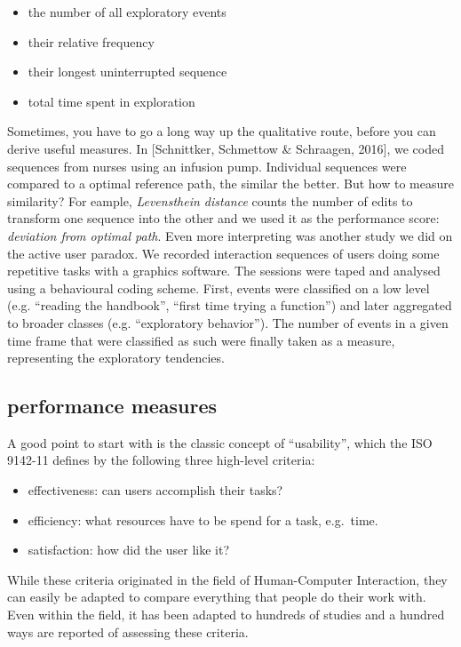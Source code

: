 \documentclass[]{svmono}
\providecommand{\tightlist}{%
  \setlength{\itemsep}{0pt}\setlength{\parskip}{0pt}}
\begin{document}
\begin{itemize}
\tightlist
\item
  the number of all exploratory events
\item
  their relative frequency
\item
  their longest uninterrupted sequence
\item
  total time spent in exploration
\end{itemize}

Sometimes, you have to go a long way up the qualitative route, before
you can derive useful measures. In {[}Schnittker, Schmettow \&
Schraagen, 2016{]}, we coded sequences from nurses using an infusion
pump. Individual sequences were compared to a optimal reference path,
the similar the better. But how to measure similarity? For eample,
\emph{Levensthein distance} counts the number of edits to transform one
sequence into the other and we used it as the performance score:
\emph{deviation from optimal path}. Even more interpreting was another
study we did on the active user paradox. We recorded interaction
sequences of users doing some repetitive tasks with a graphics software.
The sessions were taped and analysed using a behavioural coding scheme.
First, events were classified on a low level (e.g. ``reading the
handbook'', ``first time trying a function'') and later aggregated to
broader classes (e.g. ``exploratory behavior''). The number of events in
a given time frame that were classified as such were finally taken as a
measure, representing the exploratory tendencies.

\subsection{performance measures}\label{performance-measures}

A good point to start with is the classic concept of ``usability'',
which the ISO 9142-11 defines by the following three high-level
criteria:

\begin{itemize}
\tightlist
\item
  effectiveness: can users accomplish their tasks?
\item
  efficiency: what resources have to be spend for a task, e.g.~time.
\item
  satisfaction: how did the user like it?
\end{itemize}

While these criteria originated in the field of Human-Computer
Interaction, they can easily be adapted to compare everything that
people do their work with. Even within the field, it has been adapted to
hundreds of studies and a hundred ways are reported of assessing these
criteria.
\end{document}
